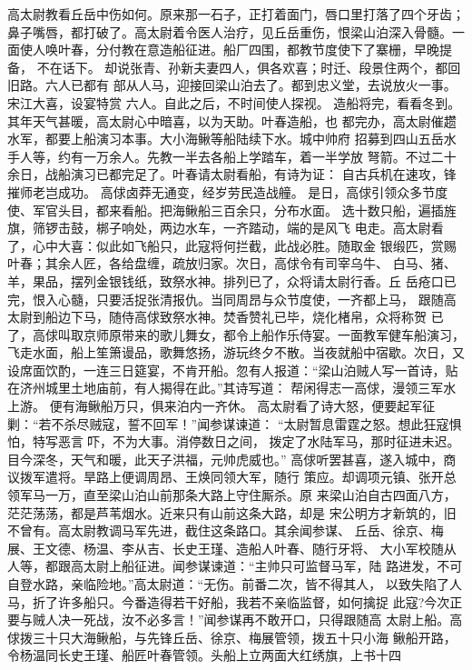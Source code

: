 高太尉教看丘岳中伤如何。原来那一石子，正打着面门，唇口里打落了四个牙齿；
鼻子嘴唇，都打破了。高太尉着令医人治疗，见丘岳重伤，恨梁山泊深入骨髓。一
面使人唤叶春，分付教在意造船征进。船厂四围，都教节度使下了寨栅，早晚提备，
不在话下。
却说张青、孙新夫妻四人，俱各欢喜；时迁、段景住两个，都回旧路。六人已都有
部从人马，迎接回梁山泊去了。都到忠义堂，去说放火一事。宋江大喜，设宴特赏
六人。自此之后，不时间使人探视。
造船将完，看看冬到。其年天气甚暖，高太尉心中暗喜，以为天助。叶春造船，也
都完办，高太尉催趱水军，都要上船演习本事。大小海鳅等船陆续下水。城中帅府
招募到四山五岳水手人等，约有一万余人。先教一半去各船上学踏车，着一半学放
弩箭。不过二十余日，战船演习已都完足了。叶春请太尉看船，有诗为证：
自古兵机在速攻，锋摧师老岂成功。
高俅卤莽无通变，经岁劳民造战艟。
是日，高俅引领众多节度使、军官头目，都来看船。把海鳅船三百余只，分布水面。
选十数只船，遍插旌旗，筛锣击鼓，梆子响处，两边水车，一齐踏动，端的是风飞
电走。高太尉看了，心中大喜：似此如飞船只，此寇将何拦截，此战必胜。随取金
银缎匹，赏赐叶春；其余人匠，各给盘缠，疏放归家。次日，高俅令有司宰乌牛、
白马、猪、羊，果品，摆列金银钱纸，致祭水神。排列已了，众将请太尉行香。丘
岳疮口已完，恨入心髓，只要活捉张清报仇。当同周昂与众节度使，一齐都上马，
跟随高太尉到船边下马，随侍高俅致祭水神。焚香赞礼已毕，烧化楮帛，众将称贺
已了，高俅叫取京师原带来的歌儿舞女，都令上船作乐侍宴。一面教军健车船演习，
飞走水面，船上笙箫谩品，歌舞悠扬，游玩终夕不散。当夜就船中宿歇。次日，又
设席面饮酌，一连三日筵宴，不肯开船。忽有人报道：“梁山泊贼人写一首诗，贴
在济州城里土地庙前，有人揭得在此。”其诗写道：
帮闲得志一高俅，漫领三军水上游。
便有海鳅船万只，俱来泊内一齐休。
高太尉看了诗大怒，便要起军征剿：“若不杀尽贼寇，誓不回军！”闻参谋谏道：
“太尉暂息雷霆之怒。想此狂寇惧怕，特写恶言吓，不为大事。消停数日之间，
拨定了水陆军马，那时征进未迟。目今深冬，天气和暖，此天子洪福，元帅虎威也。”
高俅听罢甚喜，遂入城中，商议拨军遣将。旱路上便调周昂、王焕同领大军，随行
策应。却调项元镇、张开总领军马一万，直至梁山泊山前那条大路上守住厮杀。原
来梁山泊自古四面八方，茫茫荡荡，都是芦苇烟水。近来只有山前这条大路，却是
宋公明方才新筑的，旧不曾有。高太尉教调马军先进，截住这条路口。其余闻参谋、
丘岳、徐京、梅展、王文德、杨温、李从吉、长史王瑾、造船人叶春、随行牙将、
大小军校随从人等，都跟高太尉上船征进。闻参谋谏道：“主帅只可监督马军，陆
路进发，不可自登水路，亲临险地。”高太尉道：“无伤。前番二次，皆不得其人，
以致失陷了人马，折了许多船只。今番造得若干好船，我若不亲临监督，如何擒捉
此寇?今次正要与贼人决一死战，汝不必多言！”闻参谋再不敢开口，只得跟随高
太尉上船。高俅拨三十只大海鳅船，与先锋丘岳、徐京、梅展管领，拨五十只小海
鳅船开路，令杨温同长史王瑾、船匠叶春管领。头船上立两面大红绣旗，上书十四
